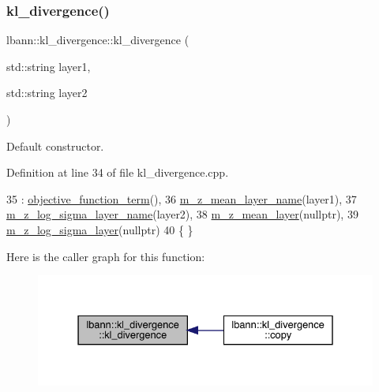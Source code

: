 \subsubsection{\texorpdfstring{kl\+\_\+divergence()}{kl\_divergence()}\hspace{0.1cm}{\footnotesize\ttfamily [1/2]}}
{\footnotesize\ttfamily lbann\+::kl\+\_\+divergence\+::kl\+\_\+divergence (\begin{DoxyParamCaption}\item[{std\+::string}]{layer1,  }\item[{std\+::string}]{layer2 }\end{DoxyParamCaption})}

Default constructor. 

Definition at line 34 of file kl\+\_\+divergence.\+cpp.


\begin{DoxyCode}
35                : \hyperlink{classlbann_1_1objective__function__term_a8c019e3c880f38dc20275e395acaeca1}{objective\_function\_term}(),
36                  \hyperlink{classlbann_1_1kl__divergence_ad9faebef778e49a01c094917bc5e72ed}{m\_z\_mean\_layer\_name}(layer1), 
37                  \hyperlink{classlbann_1_1kl__divergence_abb811a5ba98ee742838838a0137728a0}{m\_z\_log\_sigma\_layer\_name}(layer2),
38                  \hyperlink{classlbann_1_1kl__divergence_a7665b4f12f4e842d1850102295c21e3e}{m\_z\_mean\_layer}(\textcolor{keyword}{nullptr}),
39                  \hyperlink{classlbann_1_1kl__divergence_aae1f6deb97728e09771840f447a571b1}{m\_z\_log\_sigma\_layer}(\textcolor{keyword}{nullptr}) 
40                  \{ \} 
\end{DoxyCode}
Here is the caller graph for this function\+:\nopagebreak
\begin{figure}[H]
\begin{center}
\leavevmode
\includegraphics[width=331pt]{classlbann_1_1kl__divergence_a3084d98e61853086a207a3893421e4d9_icgraph}
\end{center}
\end{figure}
\mbox{\label{classlbann_1_1kl__divergence_a2262db9ab3c5383033d9e893bb4c7edd}} 
